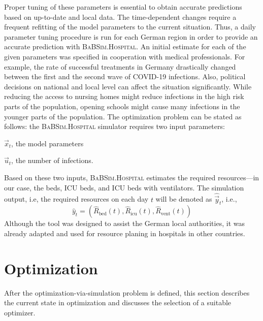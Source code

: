 \documentclass[conference]{IEEEtran}
\newcommand{\babsimhospital}{\textsc{BaBSim.Hospital}\xspace}
\begin{document}
Proper tuning of these parameters is essential to obtain accurate predictions based on up-to-date and local data. 
The time-dependent changes require a frequent refitting of the model parameters to the current situation.
Thus, a daily parameter tuning procedure is run for each German region in order to provide an accurate prediction with \babsimhospital. 
An initial estimate for each of the given parameters was specified in cooperation with medical professionals. 
For example, the rate of successful treatments in Germany drastically changed between the first and the second wave of COVID-19 infections. 
Also, political decisions on national and local level can affect the situation significantly. 
While reducing the access to nursing homes might reduce infections in the high risk parts of the population, opening schools might cause many infections in the younger parts of the population. The optimization problem can be stated as follows:
the \babsimhospital simulator requires two input parameters:
\begin{compactenum}
\item $\vec{x}_t$, the model parameters
\item $\vec{u}_t$, the number of infections.
\end{compactenum}
Based on these two inputs, \babsimhospital estimates the required resources---in our case, the beds, \gls{ICU} beds,  and \gls{ICU} beds with ventilators.
The simulation output, i.e, the required resources on each day $t$ will be denoted as $\hat{\vec{y}}_t$, i.e., 
\begin{equation}\label{eq:haty}
\hat{y}_t = \left( \hat{R}_{\text{bed}}(t),   \hat{R}_{\text{icu}}(t), \hat{R}_{\text{vent}}(t) \right)
\end{equation}
Although the tool was designed to assist the German local authorities, it was already adapted and used for resource planing in hospitals in other countries.

\section{Optimization}\label{sec:optim}
After the optimization-via-simulation problem is defined, this section describes the current state in optimization and discusses the selection of a suitable optimizer. 
\end{document}
